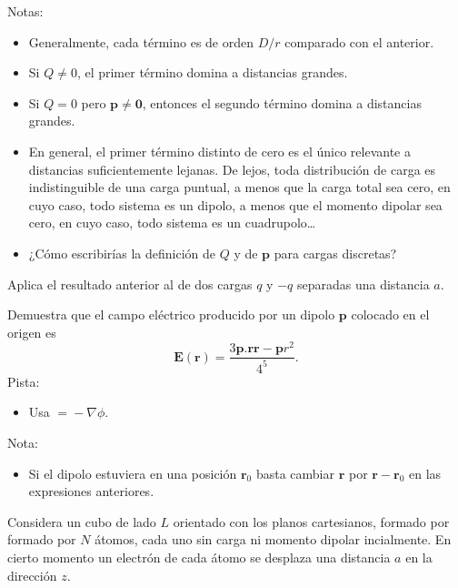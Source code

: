 \documentclass{exam}
\begin{document}
\begin{questions}
  Notas:
  \begin{itemize}
  \item Generalmente, cada término es de orden $D/r$ comparado con el
    anterior.
  \item Si $Q\ne 0$, el primer término domina a distancias grandes.
  \item Si $Q=0$ pero $\bm p\ne \bm 0$, entonces el segundo término
    domina a distancias grandes.
  \item En general, el primer término distinto de cero es el único
    relevante a distancias suficientemente lejanas. De lejos, toda
    distribución de carga es indistinguible de una carga puntual, a
    menos que la carga total sea cero, en cuyo caso, todo sistema es
    un dipolo, a menos que el momento dipolar sea cero, en cuyo caso,
    todo sistema es un cuadrupolo\ldots
  \item ¿Cómo escribirías la definición de $Q$ y de $\bm p$ para cargas
    discretas?
  \end{itemize}

  \question Aplica el resultado anterior al de dos cargas $q$ y $-q$
  separadas una distancia $a$.

  \question Demuestra que el campo eléctrico producido por un dipolo
  $\bm p$ colocado en el origen es
  $$
  \bm E(\bm r)=\frac{3\bm p.\bm r\bm r-\bm p r^2}{4^5}.
  $$
  Pista:
  \begin{itemize}
  \item Usa $\bm = -\nabla\phi$.
  \end{itemize}
  Nota:
  \begin{itemize}
  \item Si el dipolo estuviera en una posición $\bm r_0$ basta cambiar
    $\bm r$ por $\bm r-\bm r_0$ en las expresiones anteriores.
  \end{itemize}

  \question Considera un cubo de lado $L$ orientado con los planos
  cartesianos, formado por formado por $N$ átomos, cada uno sin carga
  ni momento dipolar incialmente. En cierto momento un electrón de
  cada átomo se desplaza una distancia $a$ en la dirección $z$.
\end{questions}
\end{document}
